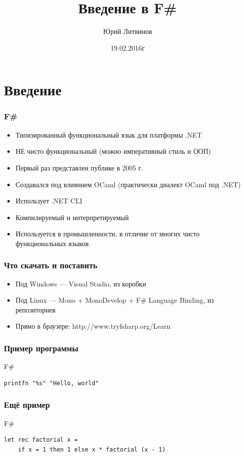 \documentclass[xetex,mathserif,serif]{beamer}
\title{Введение в F\#}
\author{Юрий Литвинов}
\date{19.02.2016г}
\begin{document}
	
	\frame{\titlepage}
	
	\section{Введение}
	
	\begin{frame}
		\frametitle{F\#}
		\begin{itemize}
			\item Типизированный функциональный язык для платформы .NET
			\item НЕ чисто функциональный (можно императивный стиль и ООП)
			\item Первый раз представлен публике в 2005 г.
			\item Создавался под влиянием OCaml (практически диалект OCaml под .NET)
			\item Использует .NET CLI
			\item Компилируемый и интерпретируемый
			\item Используется в промышленности, в отличие от многих чисто функциональных языков
		\end{itemize}
	\end{frame}

	\begin{frame}
		\frametitle{Что скачать и поставить}
		\begin{itemize}
			\item Под Windows --- Visual Studio, из коробки
			\item Под Linux --- Mono + MonoDevelop + F\# Language Binding, из репозиториев
			\item Прямо в браузере: http://www.tryfsharp.org/Learn
		\end{itemize}
	\end{frame}
	
	\begin{frame}[fragile]
		\frametitle{Пример программы}
		\begin{exampleblock}{F\#}
			\begin{lstlisting}[showstringspaces=false]
printfn "%s" "Hello, world"
            \end{lstlisting}
		\end{exampleblock}
\end{frame}
		
	\begin{frame}[fragile]
		\frametitle{Ещё пример}
		\begin{exampleblock}{F\#}
			\begin{lstlisting}
let rec factorial x =
    if x = 1 then 1 else x * factorial (x - 1)
            \end{lstlisting}
		\end{exampleblock}
\end{frame}
	
\end{document}
